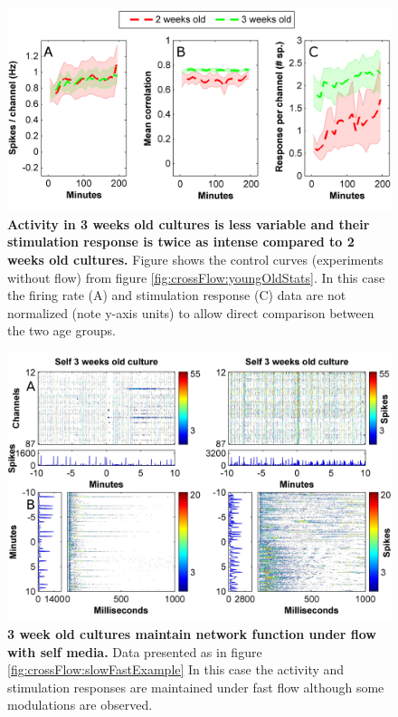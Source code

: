         \begin{figure}[h]
            \centering
            \includegraphics[width=14.5cm]{appendix/youngOldCompare.jpg}
            \caption[Comparison of activity measures for 2 and 3 week old cultures]{\textbf{Activity in 3 weeks old cultures is less variable and their stimulation response is twice as intense compared to 2 weeks old cultures.} Figure shows the control curves (experiments without flow) from figure \ref{fig:crossFlow:youngOldStats}. In this case the firing rate (A) and stimulation response (C) data are not normalized (note y-axis units) to allow direct comparison between the two age groups.}
            
            \label{fig:app:youngOldCompare}

        \end{figure}
        
        \begin{figure}[!htb]
            \centering
            \includegraphics[width=15cm]{chapter5/figures/moreOldExamples/moreOldRasterExamples.jpg}
            \caption[Further examples for 3 weeks old cultures under flow with self media]{\textbf{3 week old cultures maintain network function under flow with self media.} Data presented as in figure \ref{fig:crossFlow:slowFastExample} In this case the activity and stimulation responses are maintained under fast flow although some modulations are observed.}
            \label{fig:crossFlow:moreOldExamplesRaster}
        \end{figure}

